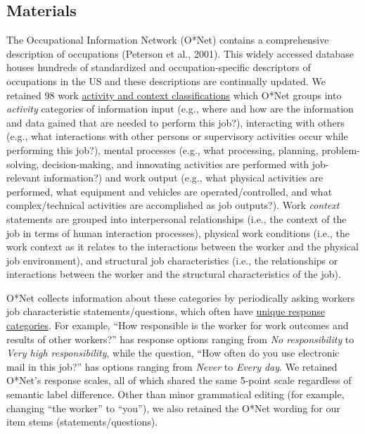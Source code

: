 \documentclass[
  english,
  man]{apa6}
\begin{document}
\hypertarget{materials}{%
\subsection{Materials}\label{materials}}

The Occupational Information Network (O*Net) contains a comprehensive description of occupations (Peterson et al., 2001). This widely accessed database houses hundreds of standardized and occupation-specific descriptors of occupations in the US and these descriptions are continually updated. We retained 98 work \href{https://www.ONETonline.org/find/descriptor/result/4.A.1.b.3}{activity and context classifications} which O*Net groups into \emph{activity} categories of information input (e.g., where and how are the information and data gained that are needed to perform this job?), interacting with others (e.g., what interactions with other persons or supervisory activities occur while performing this job?), mental processes (e.g., what processing, planning, problem-solving, decision-making, and innovating activities are performed with job-relevant information?) and work output (e.g., what physical activities are performed, what equipment and vehicles are operated/controlled, and what complex/technical activities are accomplished as job outputs?). Work \emph{context} statements are grouped into interpersonal relationships (i.e., the context of the job in terms of human interaction processes), physical work conditions (i.e., the work context as it relates to the interactions between the worker and the physical job environment), and structural job characteristics (i.e., the relationships or interactions between the worker and the structural characteristics of the job).

O*Net collects information about these categories by periodically asking workers job characteristic statements/questions, which often have \href{https://www.ONETonline.org/find/descriptor/result/4.C.1.c.2}{unique response categories}. For example, ``How responsible is the worker for work outcomes and results of other workers?'' has response options ranging from \emph{No responsibility} to \emph{Very high responsibility}, while the question, ``How often do you use electronic mail in this job?'' has options ranging from \emph{Never} to \emph{Every day}. We retained O*Net's response scales, all of which shared the same 5-point scale regardless of semantic label difference. Other than minor grammatical editing (for example, changing ``the worker'' to ``you''), we also retained the O*Net wording for our item stems (statements/questions).
\end{document}
